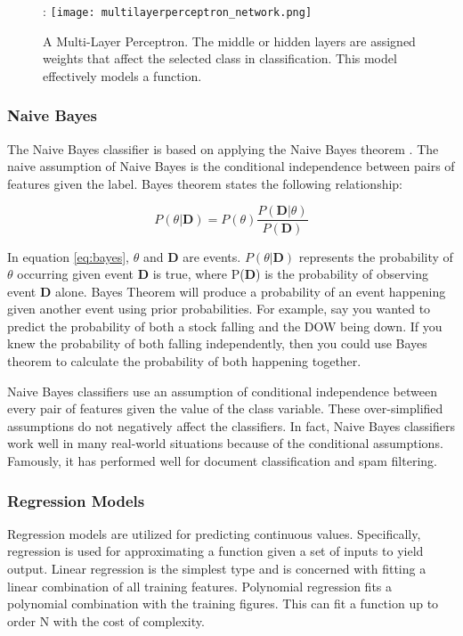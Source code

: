 \begin{figure}[htp]:
    \centering
    \texttt{[image: multilayerperceptron\_network.png]}
    \caption[Figure depicting hidden layers in a neural network]{A Multi-Layer Perceptron.
    The middle or hidden layers are assigned weights that affect the selected class in classification.
    This model effectively models a function.}
    \label{}
\end{figure}



\subsubsection{Naive Bayes}
The Naive Bayes classifier is based on applying the Naive Bayes theorem \cite{zhang2004optimality}.
The naive assumption of Naive Bayes is the conditional independence between pairs of features given the label.
Bayes theorem states the following relationship:

\begin{equation}
    \label{eq:bayes}
    P(\theta|\textbf{D}) = P(\theta) \frac{P(\textbf{D} |\theta)}{P(\textbf{D})}
\end{equation}

In equation \ref{eq:bayes}, $\theta$ and \textbf{D} are events. 
\(P(\theta | \textbf{D})\) represents the probability of $\theta$ occurring given event \textbf{D} is true, where P(\textbf{D}) is the probability of observing event \textbf{D} alone.
Bayes Theorem will produce a probability of an event happening given another event using prior probabilities.
For example, say you wanted to predict the probability of both a stock falling and the DOW being down.
If you knew the probability of both falling independently, then you could use Bayes theorem to calculate the probability of both happening together.

Naive Bayes classifiers use an assumption of conditional independence between every pair of features given the value of the class variable. 
These over-simplified assumptions do not negatively affect the classifiers.
In fact, Naive Bayes classifiers work well in many real-world situations because of the conditional assumptions\cite{zhang2004optimality}.
Famously, it has performed well for document classification and spam filtering. 

\subsubsection{Regression Models}
Regression models are utilized for predicting continuous values.
Specifically, regression is used for approximating a function given a set of inputs to yield output.
Linear regression is the simplest type and is concerned with fitting a linear combination of all training features.
Polynomial regression fits a polynomial combination with the training figures.
This can fit a function up to order N with the cost of complexity. \\

